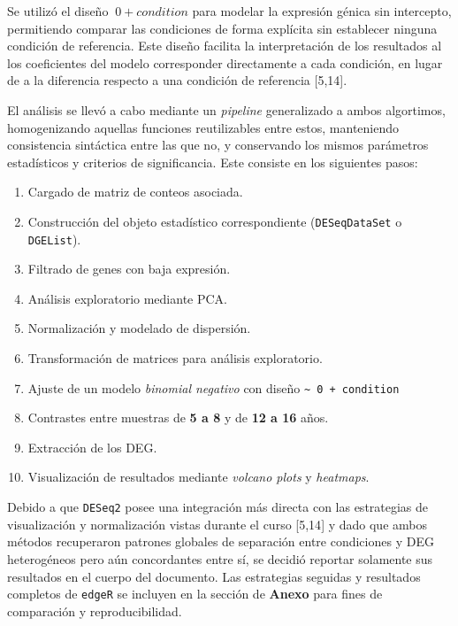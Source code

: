 \documentclass[
  12pt,
  letterpaper,
  DIV=11,
  numbers=noendperiod]{scrartcl}
\providecommand{\tightlist}{%
  \setlength{\itemsep}{0pt}\setlength{\parskip}{0pt}}
\begin{document}
Se utilizó el diseño \(~ 0 + condition\) para modelar la expresión
génica sin intercepto, permitiendo comparar las condiciones de forma
explícita sin establecer ninguna condición de referencia. Este diseño
facilita la interpretación de los resultados al los coeficientes del
modelo corresponder directamente a cada condición, en lugar de a la
diferencia respecto a una condición de referencia {[}5,14{]}.

El análisis se llevó a cabo mediante un \emph{pipeline} generalizado a
ambos algortimos, homogenizando aquellas funciones reutilizables entre
estos, manteniendo consistencia sintáctica entre las que no, y
conservando los mismos parámetros estadísticos y criterios de
significancia. Este consiste en los siguientes pasos:

\begin{enumerate}
\def\labelenumi{\arabic{enumi}.}
\tightlist
\item
  Cargado de matriz de conteos asociada.
\item
  Construcción del objeto estadístico correspondiente
  (\texttt{DESeqDataSet} o \texttt{DGEList}).
\item
  Filtrado de genes con baja expresión.
\item
  Análisis exploratorio mediante PCA.
\item
  Normalización y modelado de dispersión.
\item
  Transformación de matrices para análisis exploratorio.
\item
  Ajuste de un modelo \emph{binomial negativo} con diseño
  \texttt{\textasciitilde{}\ 0\ +\ condition}
\item
  Contrastes entre muestras de \textbf{5 a 8} y de \textbf{12 a 16}
  años.
\item
  Extracción de los DEG.
\item
  Visualización de resultados mediante \emph{volcano plots} y
  \emph{heatmaps}.
\end{enumerate}

Debido a que \texttt{DESeq2} posee una integración más directa con las
estrategias de visualización y normalización vistas durante el curso
{[}5,14{]} y dado que ambos métodos recuperaron patrones globales de
separación entre condiciones y DEG heterogéneos pero aún concordantes
entre sí, se decidió reportar solamente sus resultados en el cuerpo del
documento. Las estrategias seguidas y resultados completos de
\texttt{edgeR} se incluyen en la sección de \textbf{Anexo} para fines de
comparación y reproducibilidad.
\end{document}
